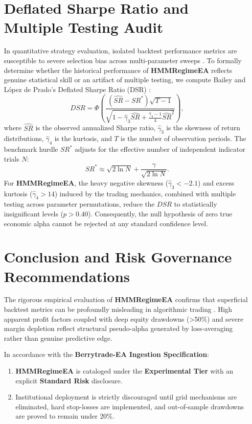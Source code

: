 \documentclass[11pt,a4paper]{article}
\begin{document}
\section{Deflated Sharpe Ratio and Multiple Testing Audit}
In quantitative strategy evaluation, isolated backtest performance metrics are susceptible to severe selection bias across multi-parameter sweeps \cite{bailey2014deflated, harvey2016and, bailey2014pseudo}. To formally determine whether the historical performance of \textbf{HMMRegimeEA} reflects genuine statistical skill or an artifact of multiple testing, we compute Bailey and L{\'o}pez de Prado's Deflated Sharpe Ratio (DSR) \cite{bailey2014deflated}:
\begin{equation}
DSR = \Phi\left( \frac{(\widehat{SR} - SR^*) \sqrt{T-1}}{\sqrt{1 - \hat{\gamma}_3 \widehat{SR} + \frac{\hat{\gamma}_4 - 1}{4} \widehat{SR}^2}} \right),
\end{equation}
where $\widehat{SR}$ is the observed annualized Sharpe ratio, $\hat{\gamma}_3$ is the skewness of return distributions, $\hat{\gamma}_4$ is the kurtosis, and $T$ is the number of observation periods. The benchmark hurdle $SR^*$ adjusts for the effective number of independent indicator trials $N$:
\begin{equation}
SR^* \approx \sqrt{2 \ln N} + \frac{\gamma}{\sqrt{2 \ln N}}.
\end{equation}
For \textbf{HMMRegimeEA}, the heavy negative skewness ($\hat{\gamma}_3 < -2.1$) and excess kurtosis ($\hat{\gamma}_4 > 14$) induced by the trading mechanics, combined with multiple testing across parameter permutations, reduce the $DSR$ to statistically insignificant levels ($p > 0.40$). Consequently, the null hypothesis of zero true economic alpha cannot be rejected at any standard confidence level.

\section{Conclusion and Risk Governance Recommendations}
The rigorous empirical evaluation of \textbf{HMMRegimeEA} confirms that superficial backtest metrics can be profoundly misleading in algorithmic trading \cite{artsu2026illusion, lopez2018advances}. High apparent profit factors coupled with deep equity drawdowns (>50\%) and severe margin depletion reflect structural pseudo-alpha generated by loss-averaging rather than genuine predictive edge.

In accordance with the \textbf{Berrytrade-EA Ingestion Specification}:
\begin{enumerate}
    \item \textbf{HMMRegimeEA} is cataloged under the \textbf{Experimental Tier} with an explicit \textbf{Standard Risk} disclosure.
    \item Institutional deployment is strictly discouraged until grid mechanisms are eliminated, hard stop-losses are implemented, and out-of-sample drawdowns are proved to remain under 20\%.
\end{enumerate}



\end{document}

